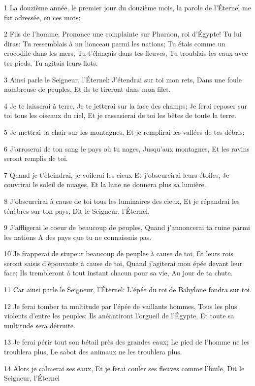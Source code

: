 \par 1 La douzième année, le premier jour du douzième mois, la parole de l'Éternel me fut adressée, en ces mots:
\par 2 Fils de l'homme, Prononce une complainte sur Pharaon, roi d'Égypte! Tu lui diras: Tu ressemblais à un lionceau parmi les nations; Tu étais comme un crocodile dans les mers, Tu t'élançais dans tes fleuves, Tu troublais les eaux avec tes pieds, Tu agitais leurs flots.
\par 3 Ainsi parle le Seigneur, l'Éternel: J'étendrai sur toi mon rets, Dans une foule nombreuse de peuples, Et ils te tireront dans mon filet.
\par 4 Je te laisserai à terre, Je te jetterai sur la face des champs; Je ferai reposer sur toi tous les oiseaux du ciel, Et je rassasierai de toi les bêtes de toute la terre.
\par 5 Je mettrai ta chair sur les montagnes, Et je remplirai les vallées de tes débris;
\par 6 J'arroserai de ton sang le pays où tu nages, Jusqu'aux montagnes, Et les ravins seront remplis de toi.
\par 7 Quand je t'éteindrai, je voilerai les cieux Et j'obscurcirai leurs étoiles, Je couvrirai le soleil de nuages, Et la lune ne donnera plus sa lumière.
\par 8 J'obscurcirai à cause de toi tous les luminaires des cieux, Et je répandrai les ténèbres sur ton pays, Dit le Seigneur, l'Éternel.
\par 9 J'affligerai le coeur de beaucoup de peuples, Quand j'annoncerai ta ruine parmi les nations A des pays que tu ne connaissais pas.
\par 10 Je frapperai de stupeur beaucoup de peuples à cause de toi, Et leurs rois seront saisis d'épouvante à cause de toi, Quand j'agiterai mon épée devant leur face; Ils trembleront à tout instant chacun pour sa vie, Au jour de ta chute.
\par 11 Car ainsi parle le Seigneur, l'Éternel: L'épée du roi de Babylone fondra sur toi.
\par 12 Je ferai tomber ta multitude par l'épée de vaillants hommes, Tous les plus violents d'entre les peuples; Ils anéantiront l'orgueil de l'Égypte, Et toute sa multitude sera détruite.
\par 13 Je ferai périr tout son bétail près des grandes eaux; Le pied de l'homme ne les troublera plus, Le sabot des animaux ne les troublera plus.
\par 14 Alors je calmerai ses eaux, Et je ferai couler ses fleuves comme l'huile, Dit le Seigneur, l'Éternel
